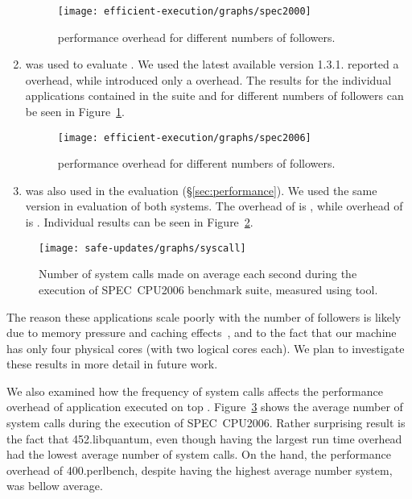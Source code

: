 \begin{enumerate}
\begin{figure}[!t]
  \centering
  \texttt{[image: efficient-execution/graphs/spec2000]}
  \caption{\speczerozero performance overhead for different numbers of followers.}
  \label{fig:spec2000}
\end{figure}

\item[\speczerozero\footnote{\url{http://www.spec.org/cpu2000/}}]
was used to evaluate \orchestra.  We used the latest available version 1.3.1.
\orchestra reported a \orchestraSpec overhead, while \varan introduced only a
\speczerozeroOneFollower overhead. The results for the individual applications
contained in the \speczerozero suite and for different numbers of followers can
be seen in Figure~\ref{fig:spec2000}.

\begin{figure}[!t]
  \centering
  \texttt{[image: efficient-execution/graphs/spec2006]}
  \caption{\speczerosix performance overhead for different numbers of followers.}
  \label{fig:spec2006}
\end{figure}

\item[\speczerosix\footnote{\url{http://www.spec.org/cpu2006/}}]
  was also used in the \mx evaluation (\S\ref{sec:performance}). We used the
  same version in evaluation of both systems.  The overhead of \mx is \mxSpec,
  while overhead of \varan is \speczerosixOneFollower.  Individual results can
  be seen in Figure~\ref{fig:spec2006}.

\end{enumerate}

\begin{figure}[ht]
\begin{center}
\texttt{[image: safe-updates/graphs/syscall]}
\caption{Number of system calls made on average each second during the
execution of SPEC~CPU2006 benchmark suite, measured using 
tool.}
\label{fig:syscall}
\end{center}
\end{figure}

The reason these applications scale
poorly with the number of followers is likely due to memory pressure and
caching effects~\cite{jaleel07}, and to the fact that our machine has only four
physical cores (with two logical cores each).  We plan to investigate these
results in more detail in future work.

We also examined how the frequency of system calls affects the
performance overhead of application executed on top \mx.
Figure~\ref{fig:syscall} shows the average number of system calls during
the execution of SPEC~CPU2006. Rather surprising result is the fact that
\textsf{452.libquantum}, even though having the largest run time
overhead had the lowest average number of system calls.  On the hand,
the performance overhead of \textsf{400.perlbench}, despite having the
highest average number system, was bellow average.

